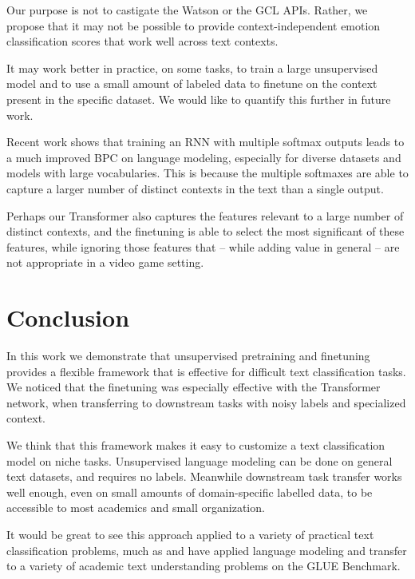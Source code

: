 \documentclass[letterpaper]{article} \usepackage{aaai19}  \usepackage{times}  \usepackage{helvet}  \usepackage{courier}  \usepackage{url}  \usepackage{graphicx}  \usepackage{booktabs}
\begin{document}
Our purpose is not to castigate the Watson or the GCL APIs. Rather, we propose that it may not be possible to provide context-independent emotion classification scores that work well across text contexts. 

It may work better in practice, on some tasks, to train a large unsupervised model and to use a small amount of labeled data to finetune on the context present in the specific dataset. We would like to quantify this further in future work. 

Recent work \cite{SoftmaxBottleneck2017} shows that training an RNN with multiple softmax outputs leads to a much improved BPC on language modeling, especially for diverse datasets and models with large vocabularies. This is because the multiple softmaxes are able to capture a larger number of distinct contexts in the text than a single output. 

Perhaps our Transformer also captures the features relevant to a large number of distinct contexts, and the finetuning is able to select the most significant of these features, while ignoring those features that -- while adding value in general -- are not appropriate in a video game setting. 


\section{Conclusion}
In this work we demonstrate that unsupervised pretraining and finetuning provides a flexible framework that is effective for difficult text classification tasks. 
We noticed that the finetuning was especially effective with the Transformer network, when transferring to downstream tasks with noisy labels and specialized context.

We think that this framework makes it easy to customize a text classification model on niche tasks. Unsupervised language modeling can be done on general text datasets, and requires no labels. Meanwhile downstream task transfer works well enough, even on small amounts of domain-specific labelled data, to be accessible to most academics and small organization. 

It would be great to see this approach applied to a variety of practical text classification problems, much as \cite{Radford2018} and \cite{devlin2018bert} have applied language modeling and transfer to a variety of academic text understanding problems on the GLUE Benchmark. 





\end{document}
